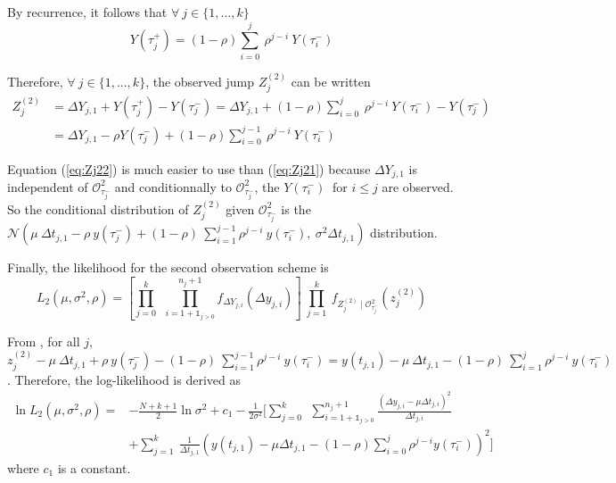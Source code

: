 
\noindent By recurrence, it follows that $\forall\ j \in \{1,...,k\}$ 
\begin{equation}
Y(\tau_j^+)= (1-\rho) \sum \limits_{i=0}^{j} \ \rho^{j-i} \ Y(\tau_i^-)
\end{equation}

\noindent Therefore, $\forall\ j \in \{1,...,k\}$, the observed jump $Z_j^{(2)}$ can be written
\begin{align}
Z_j^{(2)} &= \Delta Y_{j,1} + Y(\tau_j^+)-Y(\tau_j^-) 
= \Delta Y_{j,1} + (1-\rho) \sum \limits_{i=0}^{j} \ \rho^{j-i} \ Y(\tau_i^-) -Y(\tau_j^-) \nonumber\\
&= \Delta Y_{j,1} - \rho Y(\tau_j^-) + (1-\rho) \sum \limits_{i=0}^{j-1} \ \rho^{j-i} \ Y(\tau_i^-)  \label{eq:Zj22}
\end{align}

\noindent Equation (\ref{eq:Zj22}) is much easier to use than (\ref{eq:Zj21}) because $\Delta Y_{j,1}$ is independent of $\mathcal{O}_{\tau_j^-}^2$ and conditionnally to $\mathcal{O}_{\tau_j^-}^2$, the $Y(\tau_i^-)\ $ for $ i \leq j$ are observed. So the conditional distribution of $Z_j^{(2)}$ given $\mathcal{O}_{\tau_j^-}^2$ is the $\mathcal{N}\left(\mu \ \Delta t_{j,1} -\rho\  y(\tau_j^-)+(1-\rho)\ \sum\limits_{i=1}^{j-1} \rho^{j-i}\ y(\tau_i^-),\ \sigma^2 \Delta t_{j,1}\right)$ distribution.

\noindent Finally, the likelihood for the second observation scheme is
\begin{equation}
L_2\left(\mu,\sigma^2,\rho \right)
= \left[\prod \limits_{j=0}^{k} \ \  \prod \limits_{i=1+\mathds{1}_{j>0}}^{n_{j}+1} f_{\Delta Y_{j,i}}(\Delta y_{j,i})\right] \ \prod \limits_{j=1}^{k}\ f_{Z_j^{(2)}\mid \mathcal{O}_{\tau_j^-}^2}\left( z_j^{(2)}\right)
\label{eq:like_scheme2}
\end{equation}

\noindent From , for all $j$, $z_j^{(2)} - \mu \ \Delta t_{j,1} +\rho\  y(\tau_j^-)-(1-\rho)\ \sum\limits_{i=1}^{j-1} \rho^{j-i}\ y(\tau_i^-) = y(t_{j,1})  - \mu \ \Delta t_{j,1} -(1-\rho)\ \sum\limits_{i=1}^{j} \rho^{j-i}\ y(\tau_i^-)$. Therefore, the log-likelihood is derived as
\begin{align}
\ln L_2\left(\mu,\sigma^2,\rho \right)=&- \frac{N+k+1}{2} \ln \sigma^2 + c_1
- \frac{1}{2 \sigma^2} \bigg[\sum\limits_{j=0}^{k}\ \ \sum\limits_{i=1+\mathds{1}_{j>0}}^{n_j+1}
\frac{\left(\Delta y_{j,i} -\mu \Delta t_{j,i}\right)^2}{\Delta t_{j,i}} \nonumber\\
&+ \sum\limits_{j=1}^{k}\ \frac{1}{\Delta t_{j,1}}
\left(y(t_{j,1})-\mu \Delta t_{j,1}-(1-\rho)\sum\limits_{i=0}^{j}\rho^{j-i}y(\tau_i^-)\right)^2 \Bigg]
\label{eq:loglike_scheme2}
\end{align}
\noindent where $c_1$ is a constant.

